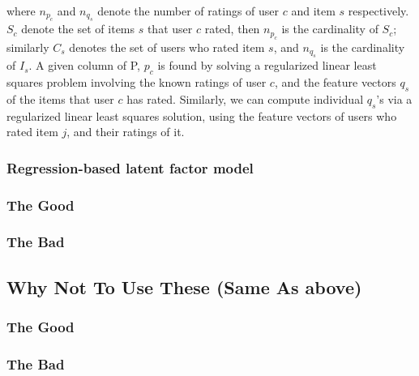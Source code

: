 where $n_{p_{c}}$ and $n_{q_{s}}$ denote the number of ratings of user $c$ and item $s$ respectively. $S_{c}$ denote the set of items $s$ that user $c$ rated, then $n_{p_{c}}$ is the cardinality of $S_{c}$; similarly $C_{s}$ denotes the set of users who rated item $s$, and $n_{q_{s}}$ is the cardinality of $I_{s}$. A given column of P, $p_{c}$ is found by solving a regularized linear least squares problem involving the known ratings of user $c$, and the feature vectors $q_{s}$ of the items that user $c$ has rated. Similarly, we can compute individual $q_{s}$'s via a regularized linear least squares solution, using the feature vectors of users who rated item $j$, and their ratings of it.

\subsubsection{Regression-based latent factor model}




\subsubsection{The Good}
\subsubsection{The Bad}
\subsection{Why Not To Use These (Same As above)}
\subsubsection{The Good}
\subsubsection{The Bad}
